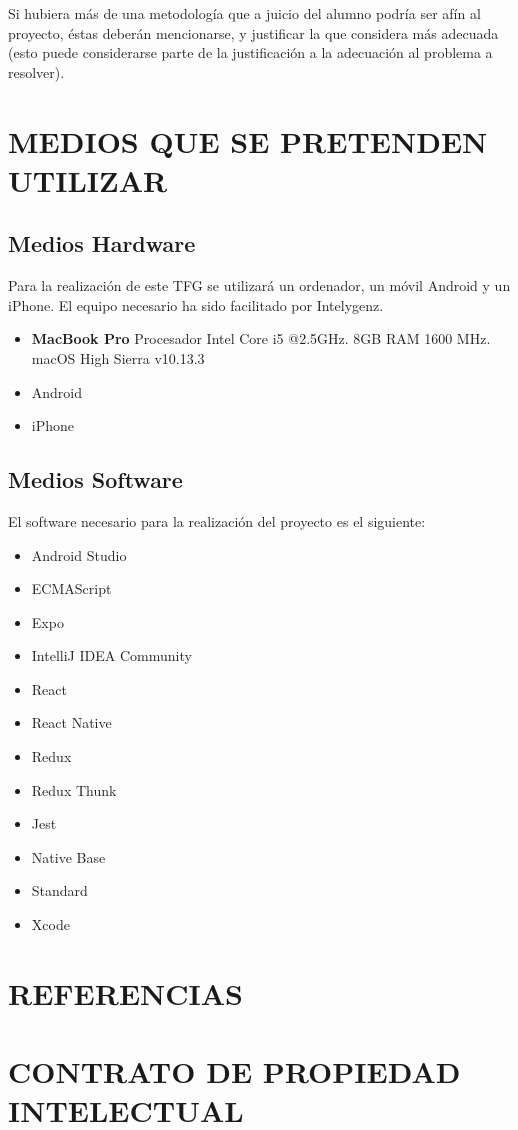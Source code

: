 \documentclass{pre-tfg}
\begin{document}
Si hubiera más de una metodología que a juicio del alumno podría ser afín al proyecto,
éstas deberán mencionarse, y justificar la que considera más adecuada (esto puede
considerarse parte de la justificación a la adecuación al problema a resolver).


\section{MEDIOS QUE SE PRETENDEN UTILIZAR}

\subsection{Medios Hardware}

Para la realización de este TFG se utilizará un ordenador, un móvil Android y un iPhone.
El equipo necesario ha sido facilitado por Intelygenz.
\begin{itemize}
  \item \textbf{MacBook Pro} Procesador Intel Core i5 @2.5GHz. 8GB RAM 1600 MHz. macOS High Sierra v10.13.3
  \item Android
  \item iPhone
\end{itemize}

\subsection{Medios Software}

El software necesario para la realización del proyecto es el siguiente:
\begin{itemize}
  \item Android Studio~\cite{ASTUDIO}
  \item ECMAScript~\cite{ECMA}
  \item Expo~\cite{Expo}
  \item IntelliJ IDEA Community~\cite{IDEA}
  \item React~\cite{REACT}
  \item React Native~\cite{RENA}
  \item Redux~\cite{REDUX}
  \item Redux Thunk~\cite{THUNK}
  \item Jest~\cite{JEST}
  \item Native Base~\cite{NABA}
  \item Standard~\cite{STAND}
  \item Xcode~\cite{XCODE}
\end{itemize}


\section{REFERENCIAS}


\singlespacing


\section{CONTRATO DE PROPIEDAD INTELECTUAL}
  
\end{document}
